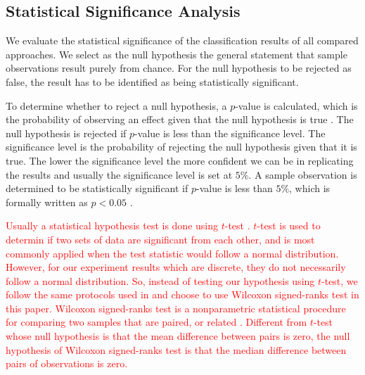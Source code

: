 \documentclass[10pt,journal,compsoc]{IEEEtran}
\begin{document}
\subsection{Statistical Significance Analysis}
We evaluate the statistical significance of the classification results of all compared approaches. We select as the null hypothesis the general statement that sample observations result purely from chance. For the null hypothesis to be rejected as false, the result has to be identified as being statistically significant.

To determine whether to reject a null hypothesis, a $p$-value is calculated, which is the probability of observing an effect given that the null hypothesis is true \cite{JLD:11}. The null hypothesis is rejected if $p$-value is less than the significance level. The significance level is the probability of rejecting the null hypothesis given that it is true. The lower the significance level the more confident we can be in replicating the results and usually the significance level is set at $5\%$. A sample observation is determined to be statistically significant if $p$-value is less than $5\%$, which is formally written as $p<0.05$ \cite{SM:06}.

\textcolor{red}{Usually a statistical hypothesis test is done using $t$-test \cite{BF:08}\cite{zimmerman1997teacher}\cite{demvsar2006statistical}. $t$-test is used to determin if two sets of data are significant from each other, and is most commonly applied when the test statistic would follow a normal distribution. However, for our experiment results which are discrete, they do not necessarily follow a normal distribution. So, instead of testing our hypothesis using $t$-test, we follow the same protocols used in \cite{chen2010ramoboost}\cite{barua2014mwmote} and choose to use Wilcoxon signed-ranks test in this paper. Wilcoxon signed-ranks test is a nonparametric statistical procedure for comparing two samples that are paired, or related \cite{GC09}. Different from $t$-test whose null hypothesis is that the mean difference between pairs is zero, the null hypothesis of Wilcoxon signed-ranks test is that the median difference between pairs of observations is zero.}
\end{document}
